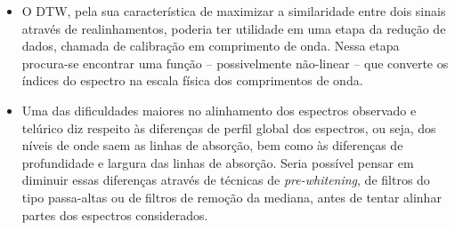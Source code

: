 \begin{itemize}



\item O DTW, pela sua característica de maximizar a similaridade entre dois sinais através de realinhamentos, poderia ter utilidade em uma etapa da redução de dados, chamada de calibração em comprimento de onda. Nessa etapa procura-se encontrar uma função -- possivelmente não-linear -- que converte os índices do espectro na escala física dos comprimentos de onda. 

\item Uma das dificuldades maiores no alinhamento dos espectros observado e telúrico diz respeito às diferenças de perfil global dos espectros, ou seja, dos níveis de onde saem as linhas de absorção, bem como às diferenças de profundidade e largura das linhas de absorção. Seria possível pensar em diminuir essas diferenças através de técnicas de \textit{pre-whitening}, de filtros do tipo passa-altas ou de filtros de remoção da mediana, antes de tentar alinhar partes dos espectros considerados. %


\end{itemize}
